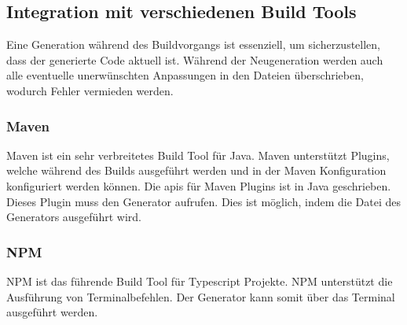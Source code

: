 \documentclass[./einleitung.tex]{subfiles}
\begin{document}
\subsection{Integration mit verschiedenen Build Tools}
Eine Generation während des Buildvorgangs ist essenziell, um sicherzustellen, dass der generierte Code aktuell ist.
Während der Neugeneration werden auch alle eventuelle unerwünschten Anpassungen in den Dateien überschrieben, wodurch Fehler vermieden werden.

\subsubsection{Maven}
Maven ist ein sehr verbreitetes Build Tool für Java.
Maven unterstützt Plugins, welche während des Builds ausgeführt werden und in der Maven Konfiguration konfiguriert werden können.
Die \acrlong{api}s für Maven Plugins ist in Java geschrieben.
Dieses Plugin muss den Generator aufrufen.
Dies ist möglich, indem die Datei des Generators ausgeführt wird.

\subsubsection{NPM}
NPM ist das führende Build Tool für Typescript Projekte.
NPM unterstützt die Ausführung von Terminalbefehlen.
Der Generator kann somit über das Terminal ausgeführt werden.

\end{document}
